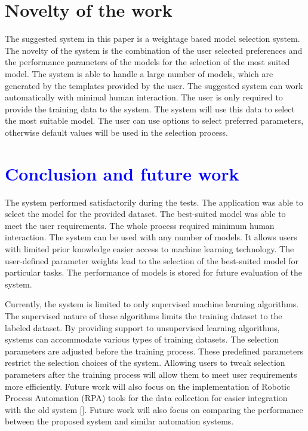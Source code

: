 \documentclass[a4paper,fleqn]{cas-dc}
\newcommand{\responsemod}{\color{blue}}
\newcommand{\responsemodsm}[1]{\textcolor{blue}{#1}}
\newcommand{\sectionb}[1]{\section{\responsemodsm{#1}}}
\begin{document}
{\responsemod
\section{Novelty of the work}\label{sec:novelty_of_the_work}

The suggested system in this paper is a weightage based model selection system. The novelty of the system is the combination of the user selected preferences and the performance parameters of the models for the selection of the most suited model. The system is able to handle a large number of models, which are generated by the templates provided by the user. The suggested system can work automatically with minimal human interaction. The user is only required to provide the training data to the system. The system will use this data to select the most suitable model. The user can use options to select preferred parameters, otherwise default values will be used in the selection process.
}

\sectionb{Conclusion and future work}\label{sec:conclusion_and_futur_work}

The system performed satisfactorily during the tests. The application was able to select the model for the provided dataset. The best-suited model was able to meet the user requirements. The whole process required minimum human interaction. The system can be used with any number of models. It allows users with limited prior knowledge easier access to machine learning technology. The user-defined parameter weights lead to the selection of the best-suited model for particular tasks. The performance of models is stored for future evaluation of the system.

Currently, the system is limited to only supervised machine learning algorithms. The supervised nature of these algorithms limits the training dataset to the labeled dataset. By providing support to unsupervised learning algorithms, systems can accommodate various types of training datasets. The selection parameters are adjusted before the training process. These predefined parameters restrict the selection choices of the system. Allowing users to tweak selection parameters after the training process will allow them to meet user requirements more efficiently. Future work will also focus on the implementation of Robotic Process Automation (RPA) tools for the data collection for easier integration with the old system []. Future work will also focus on comparing the performance between the proposed system and similar automation systems.
\end{document}
